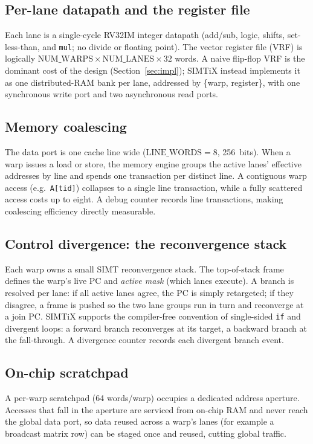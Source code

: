 \documentclass[conference]{IEEEtran}
\begin{document}
\subsection{Per-lane datapath and the register file}
Each lane is a single-cycle RV32IM integer datapath (add/sub, logic, shifts,
set-less-than, and \texttt{mul}; no divide or floating point). The vector
register file (VRF) is logically $\mathrm{NUM\_WARPS}\times\mathrm{NUM\_LANES}
\times 32$ words. A naive flip-flop VRF is the dominant cost of the design
(Section~\ref{sec:impl}); SIMTiX instead implements it as one distributed-RAM
bank per lane, addressed by \{warp, register\}, with one synchronous write port
and two asynchronous read ports.

\subsection{Memory coalescing}
The data port is one cache line wide ($\mathrm{LINE\_WORDS}=8$, 256~bits). When a
warp issues a load or store, the memory engine groups the active lanes' effective
addresses by line and spends one transaction per distinct line. A contiguous
warp access (e.g.\ \texttt{A[tid]}) collapses to a single line transaction, while
a fully scattered access costs up to eight. A debug counter records line
transactions, making coalescing efficiency directly measurable.

\subsection{Control divergence: the reconvergence stack}\label{sec:diverge}
Each warp owns a small SIMT reconvergence stack. The top-of-stack frame defines
the warp's live PC and \emph{active mask} (which lanes execute). A branch is
resolved per lane: if all active lanes agree, the PC is simply retargeted; if
they disagree, a frame is pushed so the two lane groups run in turn and
reconverge at a join PC. SIMTiX supports the compiler-free convention of
single-sided \texttt{if} and divergent loops: a forward branch reconverges at its
target, a backward branch at the fall-through. A divergence counter records each
divergent branch event.

\subsection{On-chip scratchpad}
A per-warp scratchpad (64 words/warp) occupies a dedicated address aperture.
Accesses that fall in the aperture are serviced from on-chip RAM and never reach
the global data port, so data reused across a warp's lanes (for example a
broadcast matrix row) can be staged once and reused, cutting global traffic.
\end{document}
